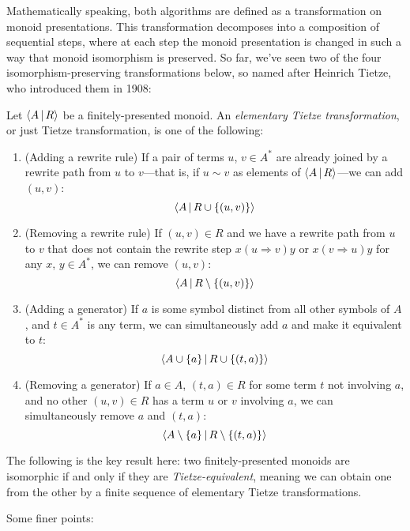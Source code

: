 \documentclass[../generics]{subfiles}
\begin{document}
Mathematically speaking, both algorithms are defined as a transformation on monoid presentations. This transformation decomposes into a composition of sequential steps, where at each step the monoid presentation is changed in such a way that monoid isomorphism is preserved. So far, we've seen two of the four isomorphism-preserving transformations below, so named after Heinrich Tietze, who introduced them in 1908:
\begin{definition}
Let $\langle A\,|\,R\rangle$ be a finitely-presented monoid. An \emph{elementary Tietze transformation}, or just Tietze transformation, is one of the following:
\begin{enumerate}
\item (Adding a rewrite rule) If a pair of terms $u$, $v\in A^*$ are already joined by a rewrite path from $u$ to $v$---that is, if $u\sim v$ as elements of $\langle A\,|\,R\rangle$---we can add $(u,v)$:
\[\langle A\,|\,R\cup\{(u,v)\}\rangle\]
\item (Removing a rewrite rule) If $(u,v)\in R$ and we have a rewrite path from $u$ to $v$ that does not contain the rewrite step $x(u\Rightarrow v)y$ or $x(v\Rightarrow u)y$ for any $x$, $y\in A^*$, we can remove $(u,v)$:
\[\langle A\,|\,R\setminus\{(u,v)\}\rangle\]
\item (Adding a generator) If $a$ is some symbol distinct from all other symbols of $A$, and $t\in A^*$ is any term, we can simultaneously add $a$ and make it equivalent to $t$:
\[\langle A\cup\{a\}\,|\,R\cup\{(t,a)\}\rangle\]
\item (Removing a generator) If $a\in A$, $(t,a)\in R$ for some term $t$ not involving $a$, and no other $(u,v)\in R$ has a term $u$ or $v$ involving $a$, we can simultaneously remove $a$ and $(t,a)$:
\[\langle A\setminus\{a\}\,|\,R\setminus\{(t,a)\}\rangle\]
\end{enumerate}
The following is the key result here: two finitely-presented monoids are isomorphic if and only if they are \emph{Tietze-equivalent}, meaning we can obtain one from the other by a finite sequence of elementary Tietze transformations.
\end{definition}
Some finer points:
\end{document}
